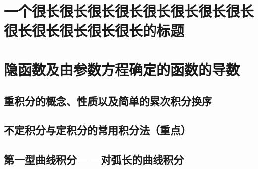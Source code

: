 \subsection{}
\zhlipsum[5]

\setcounter{chapter}{10}
\chapter{一个很长很长很长很长很长很长很长很长很长很长很长很长很长的标题}
\zhlipsum[1-3]

\chapter{隐函数及由参数方程确定的函数的导数}
\zhlipsum[6]

\cleardoublepage
\section{重积分的概念、性质以及简单的累次积分换序}
\zhlipsum[7]

\cleardoublepage
\section{不定积分与定积分的常用积分法（重点）}
\zhlipsum[8]

\cleardoublepage
\section{第一型曲线积分——对弧长的曲线积分}
\zhlipsum[9]
